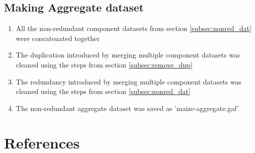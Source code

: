 \documentclass[11pt,letterpaper]{article}
\begin{document}
    \subsection{Making Aggregate dataset}
    \begin{enumerate}
      \item All the non-redundant component datasets from section \ref{subsec:nonred_dat} were concatenated together
      \item The duplication introduced by merging multiple component datasets was cleaned using the steps from section \ref{subsec:remove_dup}
      \item The redundancy introduced by merging multiple component datasets was cleaned using the steps from section \ref{subsec:nonred_dat}
      \item The non-redundant aggregate dataset was saved as 'maize-aggregate.gaf'
    \end{enumerate}

  \section{References}
  \printbibliography[heading=none]
\end{document}

